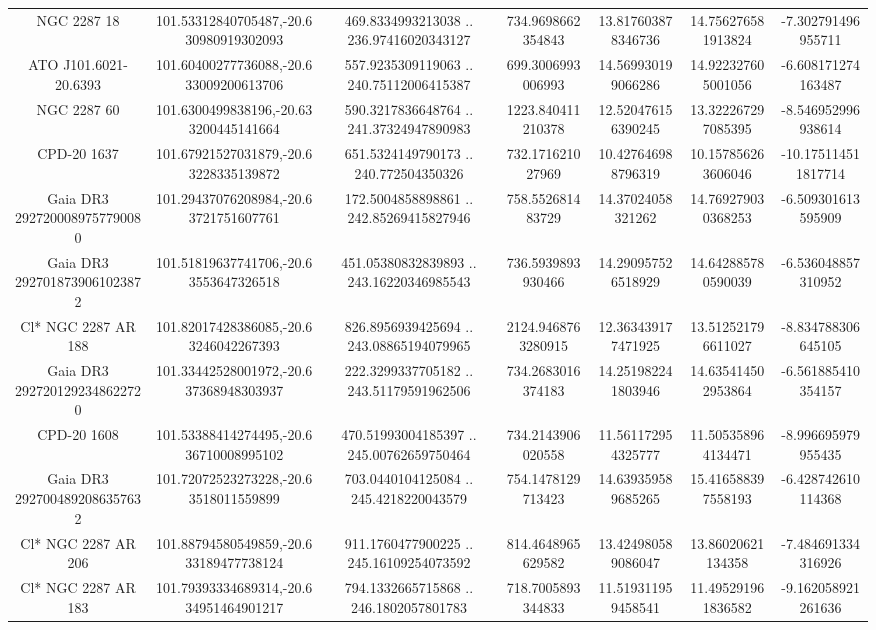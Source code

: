 \begin{table}
\begin{tabular}{ccccccc}
NGC  2287    18 & 101.53312840705487,-20.630980919302093 & 469.8334993213038 .. 236.97416020343127 & 734.9698662354843 & 13.817603878346736 & 14.756276581913824 & -7.302791496955711 \\
ATO J101.6021-20.6393 & 101.60400277736088,-20.633009200613706 & 557.9235309119063 .. 240.75112006415387 & 699.3006993006993 & 14.569930199066286 & 14.922327605001056 & -6.608171274163487 \\
NGC  2287    60 & 101.6300499838196,-20.633200445141664 & 590.3217836648764 .. 241.37324947890983 & 1223.840411210378 & 12.520476156390245 & 13.322267297085395 & -8.546952996938614 \\
CPD-20  1637 & 101.67921527031879,-20.63228335139872 & 651.5324149790173 .. 240.772504350326 & 732.171621027969 & 10.427646988796319 & 10.157856263606046 & -10.175114511817714 \\
Gaia DR3 2927200089757790080 & 101.29437076208984,-20.63721751607761 & 172.5004858898861 .. 242.85269415827946 & 758.552681483729 & 14.37024058321262 & 14.769279030368253 & -6.509301613595909 \\
Gaia DR3 2927018739061023872 & 101.51819637741706,-20.63553647326518 & 451.05380832839893 .. 243.16220346985543 & 736.5939893930466 & 14.290957526518929 & 14.642885780590039 & -6.536048857310952 \\
Cl* NGC 2287     AR     188 & 101.82017428386085,-20.63246042267393 & 826.8956939425694 .. 243.08865194079965 & 2124.9468763280915 & 12.363439177471925 & 13.512521796611027 & -8.834788306645105 \\
Gaia DR3 2927201292348622720 & 101.33442528001972,-20.637368948303937 & 222.3299337705182 .. 243.51179591962506 & 734.2683016374183 & 14.251982241803946 & 14.635414502953864 & -6.561885410354157 \\
CPD-20  1608 & 101.53388414274495,-20.636710008995102 & 470.51993004185397 .. 245.00762659750464 & 734.2143906020558 & 11.561172954325777 & 11.505358964134471 & -8.996695979955435 \\
Gaia DR3 2927004892086357632 & 101.72072523273228,-20.63518011559899 & 703.0440104125084 .. 245.4218220043579 & 754.1478129713423 & 14.639359589685265 & 15.416588397558193 & -6.428742610114368 \\
Cl* NGC 2287     AR     206 & 101.88794580549859,-20.633189477738124 & 911.1760477900225 .. 245.16109254073592 & 814.4648965629582 & 13.424980589086047 & 13.86020621134358 & -7.484691334316926 \\
Cl* NGC 2287     AR     183 & 101.79393334689314,-20.634951464901217 & 794.1332665715868 .. 246.1802057801783 & 718.7005893344833 & 11.519311959458541 & 11.495291961836582 & -9.162058921261636 \\

\end{tabular}
\end{table}

